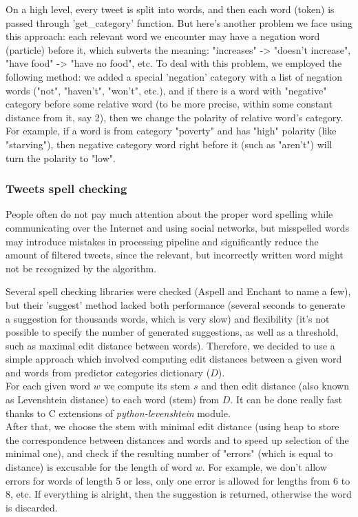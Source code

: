 \documentclass[12pt]{report}
\begin{document}
On a high level, every tweet is split into words, and then each word (token) is passed through 'get\_category' function. But here's another problem we face using this approach: each relevant word we encounter may have a negation word (particle) before it, which subverts the meaning: "increases" -> "doesn't increase", "have food" -> "have no food", etc. To deal with this problem, we employed the following method: we added a special 'negation' category with a list of negation words ("not", "haven't", "won't", etc.), and if there is a word with "negative" category before some relative word (to be more precise, within some constant distance from it, say 2), then we change the polarity of relative word's category. For example, if a word is from category "poverty" and has "high" polarity (like "starving"), then negative category word right before it (such as "aren't") will turn the polarity to "low".


\subsubsection*{Tweets spell checking }
People often do not pay much attention about the proper word spelling while communicating over the Internet and using social networks, but misspelled words may introduce mistakes in processing pipeline and significantly reduce the amount of filtered tweets, since the relevant, but incorrectly written word might not be recognized by the algorithm.

Several spell checking libraries were checked (Aspell and Enchant to name a few), but their 'suggest' method lacked both performance (several seconds to generate a suggestion for thousands words, which is very slow) and flexibility (it's not possible to specify the number of generated suggestions, as well as a threshold, such as maximal edit distance between words). Therefore, we decided to use a simple approach which involved computing edit distances between a given word and words from predictor categories dictionary ($D$).
\\
For each given word $w$ we compute its stem $s$ and then edit distance (also known as Levenshtein distance) to each word (stem) from $D$. It can be done really fast thanks to C extensions of \textit{python-levenshtein} module.
\\
After that, we choose the stem with minimal edit distance (using heap to store the correspondence between distances and words and to speed up selection of the minimal one), and check if the resulting number of "errors" (which is equal to distance) is excusable for the length of word $w$. For example, we don't allow errors for words of length 5 or less, only one error is allowed for lengths from 6 to 8, etc. If everything is alright, then the suggestion is returned, otherwise the word is discarded.
\end{document}
